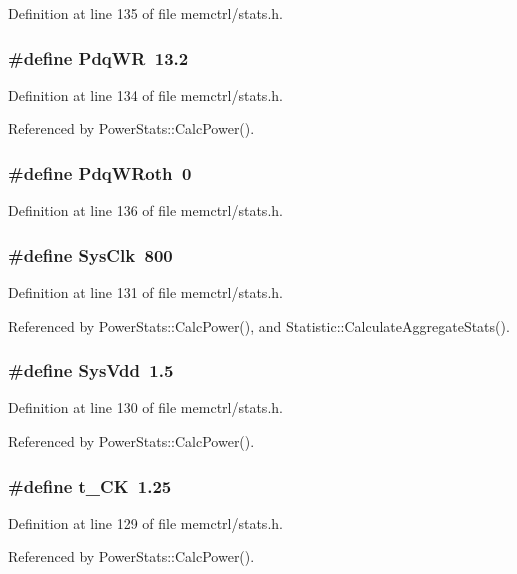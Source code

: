 Definition at line 135 of file memctrl/stats.h.
\subsubsection[{PdqWR}]{\setlength{\rightskip}{0pt plus 5cm}\#define PdqWR~13.2}\label{memctrl_2stats_8h_fb5be3519c2b3be2d6c09792695ba16c}




Definition at line 134 of file memctrl/stats.h.

Referenced by PowerStats::CalcPower().
\subsubsection[{PdqWRoth}]{\setlength{\rightskip}{0pt plus 5cm}\#define PdqWRoth~0}\label{memctrl_2stats_8h_f5887b73db74a294da7a07874deacdc6}




Definition at line 136 of file memctrl/stats.h.
\subsubsection[{SysClk}]{\setlength{\rightskip}{0pt plus 5cm}\#define SysClk~800}\label{memctrl_2stats_8h_d44e93f53acd19749e32d59abcb8554f}




Definition at line 131 of file memctrl/stats.h.

Referenced by PowerStats::CalcPower(), and Statistic::CalculateAggregateStats().
\subsubsection[{SysVdd}]{\setlength{\rightskip}{0pt plus 5cm}\#define SysVdd~1.5}\label{memctrl_2stats_8h_a449d2aa9ca7e0674660afe8179df839}




Definition at line 130 of file memctrl/stats.h.

Referenced by PowerStats::CalcPower().
\subsubsection[{t\_\-CK}]{\setlength{\rightskip}{0pt plus 5cm}\#define t\_\-CK~1.25}\label{memctrl_2stats_8h_e93bb720f685333933de5bf2d3e88bad}




Definition at line 129 of file memctrl/stats.h.

Referenced by PowerStats::CalcPower().